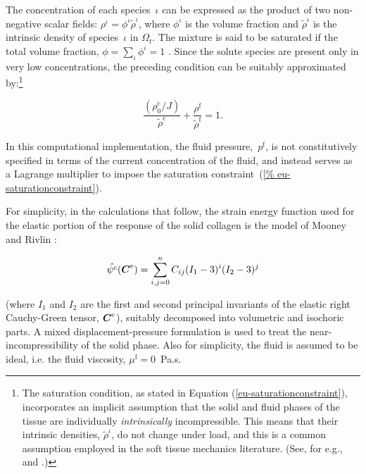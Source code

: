 The concentration of each species~$\iota$ can be expressed as the
product of two non-negative scalar fields: $\rho^\iota = \phi^\iota
\tilde{\rho}^\iota$, where $\phi^\iota$ is the volume fraction and
$\tilde{\rho}^\iota$ is the intrinsic density of species~$\iota$ in
$\Omega_{t}$. The mixture is said to be saturated if the total volume
fraction, \mbox{$\phi = \sum\limits_{\iota}\phi^\iota = 1$}
\citep{passmanetal}. Since the solute species are present only in very
low concentrations, the preceding condition can be suitably
approximated by:\footnote{The saturation condition, as stated in
  Equation (\ref{eu-saturationconstraint}), incorporates an implicit
  assumption that the solid and fluid phases of the tissue are
  individually {\em intrinsically} incompressible. This means that
  their intrinsic densities, $\tilde{\rho}^\iota$, do not change under
  load, and this is a common assumption employed in the soft tissue
  mechanics literature. (See, for e.g., \citet{mowetal1980} and
  \citet{ateshian07}.)}

\begin{equation}
\frac{\left(\rho_{0}^{\mathrm{c}}/J\right)}
     {\tilde{\rho}^{\mathrm{c}}} +
     \frac{\rho^{\mathrm{f}}}{\tilde{\rho}^{\mathrm{f}}} = 1.
\label{eu-saturationconstraint}
\end{equation}

\noindent In this computational implementation, the fluid
pressure,~$p^{\mathrm{f}}$, is not constitutively specified in terms
of the current concentration of the fluid, and instead serves as a
Lagrange multiplier to impose the saturation constraint~(\ref{%
  eu-saturationconstraint}).

For simplicity, in the calculations that follow, the strain energy
function used for the elastic portion of the response of the solid
collagen is the model of Mooney and Rivlin \citep{mooney1940}:

\begin{equation}
\hat{\psi^{\mathrm{c}}} (\mbox{\boldmath$ C$}^{\mathrm{e}}) = \sum\limits_{i,j=0}^{n}
C_{ij} (I_{1}-3)^{i} (I_{2}-3)^{j}
\label{mooney-rivlin-model}
\end{equation}

\noindent (where $I_{1}$ and $I_{2}$ are the first and second
principal invariants of the elastic right Cauchy-Green tensor,
$\mbox{\boldmath$ C$}^{\mathrm{e}}$), suitably decomposed into volumetric and isochoric
parts. A mixed displacement-pressure \citep{ZienkTay:89} formulation
is used to treat the near-incompressibility of the solid phase. Also
for simplicity, the fluid is assumed to be ideal, i.e. the fluid
viscosity, $\mu^{\mathrm{f}}=0$~Pa.s.


